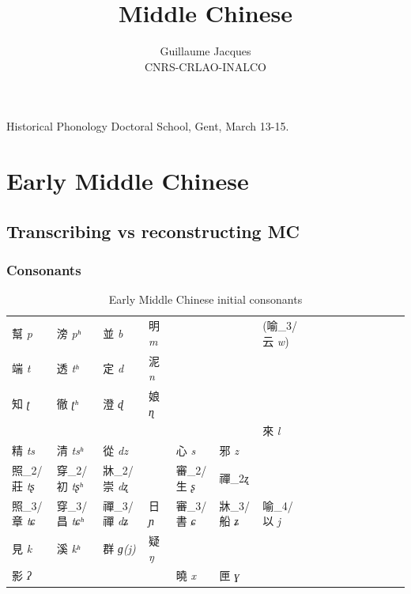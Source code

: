 \documentclass[oneside,a4paper,11pt]{article}
\newcommand{\ipa}[1]{{\phon\textit{#1}}}
\newcommand{\zh}[1]{{\cn #1}}
\newcommand{\zhc}[2]{\zh{#1} \ipa{#2}}
\begin{document}
 
\title{Middle Chinese}
\author{Guillaume Jacques\\ CNRS-CRLAO-INALCO}
\maketitle
Historical Phonology Doctoral School, Gent, March 13-15.

\section{Early Middle Chinese} \label{sec:emc}

\subsection{Transcribing vs reconstructing MC}

\subsubsection{Consonants}
\begin{table}[H]
\caption{Early Middle Chinese initial consonants} \label{tab:mc.onset}
\begin{tabular}{llllllllllllllll}
\toprule
 	\zhc{幫}{p} & 	\zhc{滂}{pʰ} & 	\zhc{並}{b} & 	\zhc{明}{m} & 	 & 	 & (\zh{喻}_3/\zhc{云}{w})	 & 	\\
  	\zhc{端}{t} & 	\zhc{透}{tʰ} & 	\zhc{定}{d} & 	\zhc{泥}{n} & 	 & 	 & 	 & 	\\
 	\zhc{知}{ʈ} & 	\zhc{徹}{ʈʰ} & 	\zhc{澄}{ɖ} & 	\zhc{娘}{ɳ} & 	 & 	 & 	 & 	\\
  	 & 	 & 	 & 	 & 	 & 	 & 	\zhc{來}{l} & 	\\
  	\zhc{精}{ts} & 	\zhc{清}{tsʰ} & 	\zhc{從}{dz} & 	 & 	\zhc{心}{s} & 	\zhc{邪}{z} & 	 & 	\\
  	\zh{照}_2/\zhc{莊}{tʂ} & 	\zh{穿}_2/\zhc{初}{tʂʰ} & 	\zh{牀}_2/\zhc{崇}{dʐ} & 	 & 	  	\zh{審}_2/\zhc{生}{ʂ} & 	 \zh{禪}_2\ipa{ʐ} & 	 & 	\\
 	  	\zh{照}_3/\zhc{章}{tɕ} & 	\zh{穿}_3/\zhc{昌}{tɕʰ} & 	\zh{禪}_3/\zhc{禪}{dʑ} & 	\zhc{日}{ɲ} & 	\zh{審}_3/\zhc{書}{ɕ} & 	\zh{牀}_3/\zhc{船}{ʑ} & 	\zh{喻}_4/\zhc{以}{j} & 	\\
 	\zhc{見}{k} & 	\zhc{溪}{kʰ} & 	\zhc{群}{ɡ(j)} & 	\zhc{疑}{ŋ} & 	 & 	 & 	 & 	\\
 	\zhc{影}{ʔ} & 	 & 	 & 	 & 	\zhc{曉}{x} & 	\zhc{匣}{ɣ} & 	 & 	\\
\bottomrule
\end{tabular}
\end{table}
\end{document}
